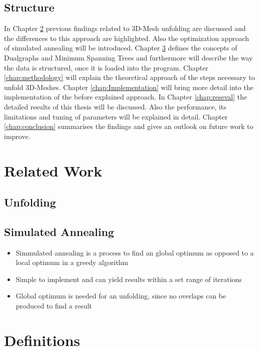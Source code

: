 \documentclass[draft,final]{vutinfth} %
\begin{document}
\section{Structure}
In Chapter \ref{chap:relatedwork} previous findings related to 3D-Mesh unfolding are discussed and the differences to this approach are highlighted. Also the optimization approach of simulated annealing will be introduced. Chapter \ref{chap:definitions} defines the concepts of Dualgraphs and Minimum Spanning Trees and furthermore will describe the way the data is structured, once it is loaded into the program. Chapter \ref{chap:methodology} will explain the theoretical approach of the steps necessary to unfold 3D-Meshes. Chapter \ref{chap:Implementation} will bring more detail into the implementation of the before explained approach. In Chapter \ref{chap:reseval} the detailed results of this thesis will be discussed. Also the performance, its limitations and tuning of parameters will be explained in detail. Chapter \ref{chap:conclusion} summarises the findings and gives an outlook on future work to improve.

\chapter{Related Work}
\label{chap:relatedwork}

\section{Unfolding}

\section{Simulated Annealing}

\begin{itemize}
	\item Simmulated annealing is a process to find an global optimum as opposed to a local optimum in a greedy algorithm
	\item Simple to implement and can yield results within a set range of iterations
	\item Global optimum is needed for an unfolding, since no overlaps can be produced to find a result
\end{itemize}

\chapter{Definitions}
\label{chap:definitions}
\end{document}
